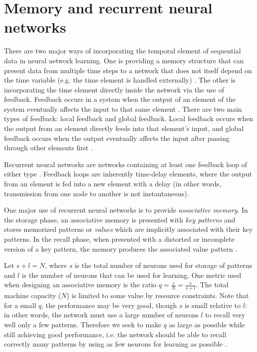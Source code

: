 \section{Memory and recurrent neural networks}

There are two major ways of incorporating the temporal element of sequential data in neural network learning. One is providing a memory structure that can present data from multiple time steps to a network that does not itself depend on the time variable (e.g. the time element is handled externally) \cite[p. 672-673]{Haykin:2009:NNC:1213811}. The other is incorporating the time element directly inside the network via the use of feedback. Feedback occurs in a system when the output of an element of the system eventually affects the input to that same element \cite[p. 18]{Haykin:2009:NNC:1213811}. There are two main types of feedback: local feedback and global feedback. Local feedback occurs when the output from an element directly feeds into that element's input, and global feedback occurs when the output eventually affects the input after passing through other elements first \cite[p. 673]{Haykin:2009:NNC:1213811}.

Recurrent neural networks are networks containing at least one feedback loop of either type \cite[p. 23]{Haykin:2009:NNC:1213811}. Feedback loops are inherently time-delay elements, where the output from an element is fed into a new element with a delay (in other words, transmission from one node to another is not instantaneous).

One major use of recurrent neural networks is to provide \emph{associative memory}. In the storage phase, an associative memory is presented with \emph{key patterns} and stores memorized patterns or \emph{values} which are implicitly associated with their key patterns. In the recall phase, when presented with a distorted or incomplete version of a key pattern, the memory produces the associated value pattern \cite[p. 38]{Haykin:2009:NNC:1213811}.

Let $s + l = N$, where $s$ is the total number of neurons used for storage of patterns and $l$ is the number of neurons that can be used for learning. One metric used when designing an associative memory is the ratio $q = \frac{s}{N} = \frac{s}{s + l}$. The total machine capacity ($N$) is limited to some value by resource constraints. Note that for a small $q$, the performance may be very good, though $s$ is small relative to $l$: in other words, the network must use a large number of neurons $l$ to recall very well only a few patterns. Therefore we seek to make $q$ as large as possible while still achieving good performance, i.e. the network should be able to recall correctly many patterns by using as few neurons for learning as possible \cite[p. 39]{Haykin:2009:NNC:1213811}.

